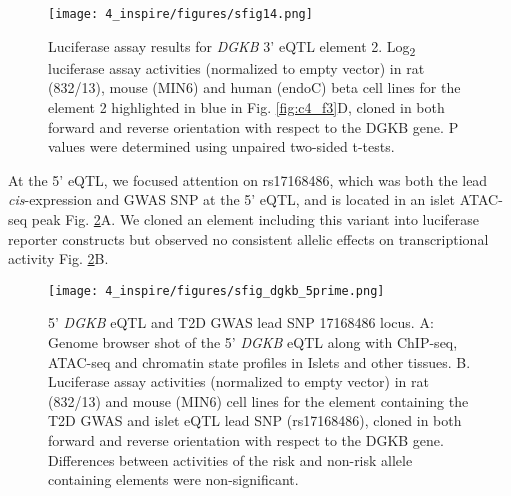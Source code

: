 \begin{figure}
    \centering
    \texttt{[image: 4\_inspire/figures/sfig14.png]}
    \caption[Luciferase assay results for \textit{DGKB} 3' eQTL element 2]{Luciferase assay results for \textit{DGKB} 3' eQTL element 2. Log\textsubscript{2} luciferase assay activities (normalized to empty vector) in rat (832/13), mouse (MIN6) and human (endoC) beta cell lines for the element 2 highlighted in blue in Fig. \ref{fig:c4_f3}D, cloned in both forward and reverse orientation with respect to the DGKB gene. P values were determined using unpaired two-sided t-tests.}
    \label{fig:c4_sf14}
\end{figure}
  
At the 5' eQTL, we focused attention on rs17168486, which was both the lead \textit{cis}-expression and GWAS SNP at the 5' eQTL, and is located in an islet ATAC-seq peak  Fig. \ref{fig:c4_sf_dgkb_5prime}A. We cloned an element including this variant into luciferase reporter constructs but observed no consistent allelic effects on transcriptional activity Fig. \ref{fig:c4_sf_dgkb_5prime}B. 

\begin{figure}
    \centering
    \texttt{[image: 4\_inspire/figures/sfig\_dgkb\_5prime.png]}
    \caption[5' \textit{DGKB} eQTL and T2D GWAS lead SNP 17168486 locus]{5' \textit{DGKB} eQTL and T2D GWAS lead SNP 17168486 locus. A: Genome browser shot of the 5' \textit{DGKB} eQTL along with ChIP-seq, ATAC-seq and chromatin state profiles in Islets and other tissues. B. Luciferase assay activities (normalized to empty vector) in rat (832/13) and mouse (MIN6) cell lines for the element containing the T2D GWAS and islet eQTL lead SNP (rs17168486), cloned in both forward and reverse orientation with respect to the DGKB gene. Differences between activities of the risk and non-risk allele containing elements were non-significant.}
    \label{fig:c4_sf_dgkb_5prime}
\end{figure}

